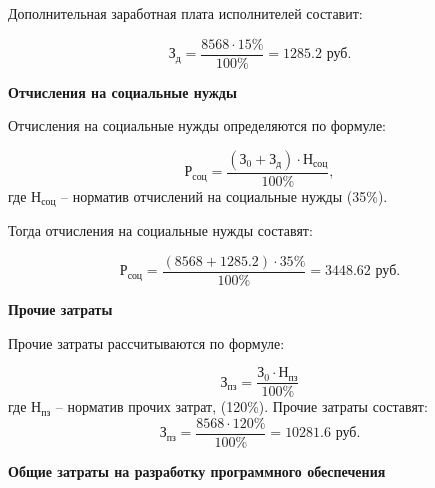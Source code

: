 Дополнительная заработная плата исполнителей составит:

\begin{equation*}
    \textit{З}_\textit{д} = \frac{8568 \cdot 15\%}{100\%} = 1285.2 \textrm{ руб.}
\end{equation*}

\bigskip
\textbf{Отчисления на социальные нужды}

Отчисления на социальные нужды определяются по формуле:

\begin{equation}
    \textit{Р}_\textit{соц} = \frac{(\textit{З}_0 + \textit{З}_\textit{д}) \cdot \textit{Н}_\textit{соц}}{100\%},
\end{equation}
где $\textit{Н}_\textit{соц}$ – норматив отчислений на социальные нужды (35\%). 

Тогда отчисления на социальные нужды составят:

\begin{equation*}
    \textit{Р}_\textit{соц} = \frac{(8568 + 1285.2) \cdot 35\%}{100\%} = 3448.62 \textrm{ руб.}
\end{equation*}

\bigskip
\textbf{Прочие затраты}

Прочие затраты рассчитываются по формуле:

\begin{equation}
    \textit{З}_\textit{пз} = \frac{\textit{З}_0 \cdot \textit{Н}_\textit{пз}}{100\%}
\end{equation}
где $\textit{Н}_\textit{пз}$ – норматив прочих затрат, (120\%).
Прочие затраты составят:
\begin{equation*}
    \textit{З}_\textit{пз} = \frac{8568 \cdot 120\%}{100\%} = 10281.6 \textrm{ руб.}
\end{equation*}

\bigskip
\textbf{Общие затраты на разработку программного обеспечения}

